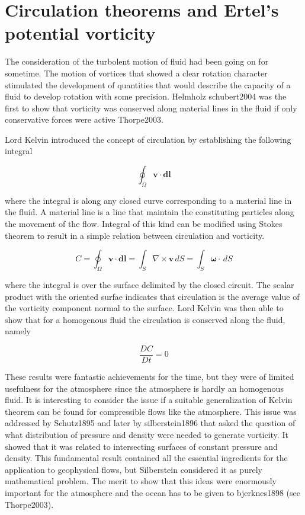 \section{Circulation theorems and Ertel's potential vorticity}

The consideration of the turbolent motion of fluid had been going on for
sometime. The motion of vortices that showed a clear rotation character
stimulated the development of quantities that would describe the
capacity of a fluid to develop rotation with some precision. Helmholz
schubert2004 was the first to show that vorticity was conserved along
material lines in the fluid if only conservative forces were active
Thorpe2003.

Lord Kelvin introduced the concept of circulation by establishing the
following integral

\[\oint_\Omega \mathbf{v}\cdot  \mathbf{dl}\]

where the integral is along any closed curve corresponding to a material
line in the fluid. A material line is a line that maintain the
constituting particles along the movement of the flow. Integral of this
kind can be modified using Stokes theorem to result in a simple
relation between circulation and vorticity.

\[
C=\oint_\Omega \mathbf{v}\cdot  \mathbf{dl} = \int_S \nabla\times\mathbf{v}\, dS = \int_S \mathbf{\omega}\cdot \, dS
\]

where the integral is over the surface delimited by the closed circuit.
The scalar product with the oriented surfae indicates that circulation
is the average value of the vorticity component normal to the surface.
Lord Kelvin was then able to show that for a homogenous fluid the
circulation is conserved along the fluid, namely

\[\frac{D C}{Dt} = 0\]

These results were fantastic achievements for the time, but they were of
limited usefulness for the atmosphere since the atmosphere is hardly an
homogenous fluid. It is interesting to consider the issue if a suitable
generalization of Kelvin theorem can be found for compressible flows
like the atmosphere. This issue was addressed by Schutz1895 and later by
silberstein1896 that asked the question of what distribution of pressure
and density were needed to generate vorticity. It showed that it was
related to intersecting surfaces of constant pressure and density. This
fundamental result contained all the essential ingredients for the
application to geophysical flows, but Silberstein considered it as
purely mathematical problem. The merit to show that this ideas were
enormously important for the atmosphere and the ocean has to be given to
bjerknes1898 (see Thorpe2003).

